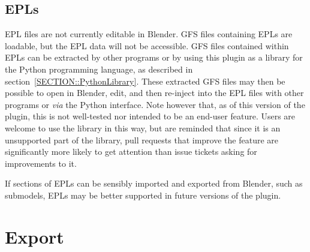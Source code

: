 \documentclass{article}
\begin{document}
\clearpage

\subsection{EPLs}
\label{SECTION::Edits::Epls}
EPL files are not currently editable in Blender. GFS files containing EPLs are loadable, but the EPL data will not be accessible. GFS files contained within EPLs can be extracted by other programs or by using this plugin as a library for the Python programming language, as described in section~\ref{SECTION::PythonLibrary}. These extracted GFS files may then be possible to open in Blender, edit, and then re-inject into the EPL files with other programs or \textit{via} the Python interface. Note however that, as of this version of the plugin, this is not well-tested nor intended to be an end-user feature. Users are welcome to use the library in this way, but are reminded that since it is an unsupported part of the library, pull requests that improve the feature are significantly more likely to get attention than issue tickets asking for improvements to it.

If sections of EPLs can be sensibly imported and exported from Blender, such as submodels, EPLs may be better supported in future versions of the plugin.

\clearpage

\section{Export}
\end{document}
